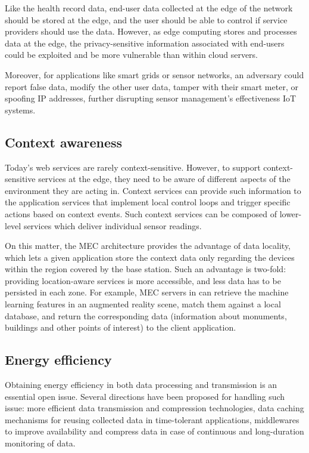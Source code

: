 Like the health record data, end-user data collected at the edge of the network should be stored at the edge, and the user should be able to control if service providers should use the data. However, as edge computing stores and processes data at the edge, the privacy-sensitive information associated with end-users could be exploited and be more vulnerable than within cloud servers.

Moreover, for applications like smart grids or sensor networks, an adversary could report false data, modify the other user data, tamper with their smart meter, or spoofing IP addresses, further disrupting sensor management's effectiveness IoT systems.

\subsection{Context awareness}

Today's web services are rarely context-sensitive. However, to support context-sensitive services at the edge, they need to be aware of different aspects of the environment they are acting in. Context services can provide such information to the application services that implement local control loops and trigger specific actions based on context events. Such context services can be composed of lower-level services which deliver individual sensor readings.

On this matter, the MEC architecture provides the advantage of data locality, which lets a given application store the context data only regarding the devices within the region covered by the base station. Such an advantage is two-fold: providing location-aware services is more accessible, and less data has to be persisted in each zone. For example, MEC servers in \cite{baresi2017empowering} can retrieve the machine learning features in an augmented reality scene, match them against a local database, and return the corresponding data (information about monuments, buildings and other points of interest) to the client application.

\subsection{Energy efficiency}

Obtaining energy efficiency in both data processing and transmission is an essential open issue. Several directions have been proposed for handling such issue: more efficient data transmission and compression technologies, data caching mechanisms for reusing collected data in time-tolerant applications, middlewares to improve availability and compress data in case of continuous and long-duration monitoring of data.

